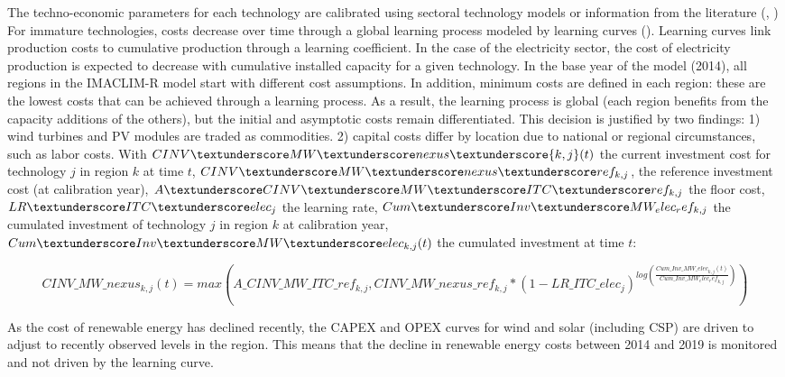 The techno-economic parameters for each technology are calibrated using sectoral technology models or information from the literature (\cite{IEA2020}, \cite{IRENA2020})
For immature technologies, costs decrease over time through a global learning process modeled by learning curves (\cite{Neij2008}). Learning curves link production costs to cumulative production through a learning coefficient. In the case of the electricity sector, the cost of electricity production is expected to decrease with cumulative installed capacity for a given technology. In the base year of the model (2014), all regions in the IMACLIM-R model start with different cost assumptions. In addition, minimum costs are defined in each region: these are the lowest costs that can be achieved through a learning process. As a result, the learning process is global (each region benefits from the capacity additions of the others), but the initial and asymptotic costs remain differentiated. This decision is justified by two findings: 1) wind turbines and PV modules are traded as commodities. 2) capital costs differ by location due to national or regional circumstances, such as labor costs. With $CINV \textunderscore MW\textunderscore nexus\textunderscore {k,j}(t)$ the current investment cost for technology $j$ in region $k$ at time $t$, $CINV\textunderscore MW\textunderscore nexus \textunderscore ref_{k,j}$, the reference investment cost (at calibration year), $A\textunderscore CINV\textunderscore MW\textunderscore ITC\textunderscore ref_{k,j}$ the floor cost,  $LR\textunderscore ITC\textunderscore elec_{j}$ the learning rate, $Cum\textunderscore Inv\textunderscore MW_ elec_ ref_{k,j}$ the cumulated investment of technology $j$ in region $k$ at calibration year, $Cum\textunderscore Inv\textunderscore MW\textunderscore elec_{k,j}(t)$ the cumulated investment at time $t$:

\begin{dmath}
    CINV\_MW\_nexus_{k,j}(t) = max(A\_CINV\_MW\_ITC\_ref_{k,j},CINV\_MW\_nexus \_ref_{k,j}*(1-LR\_ ITC\_elec_{j})^{log(\frac{Cum\_Inv\_MW\_elec_{k,j}(t)}{Cum\_Inv\_MW_elec_ ref_{k,j}})})
    \label{eqn:LR}
\end{dmath}

As the cost of renewable energy has declined recently, the CAPEX and OPEX curves for wind and solar (including CSP) are driven to adjust to recently observed levels in the region. This means that the decline in renewable energy costs between 2014 and 2019 is monitored and not driven by the learning curve.


